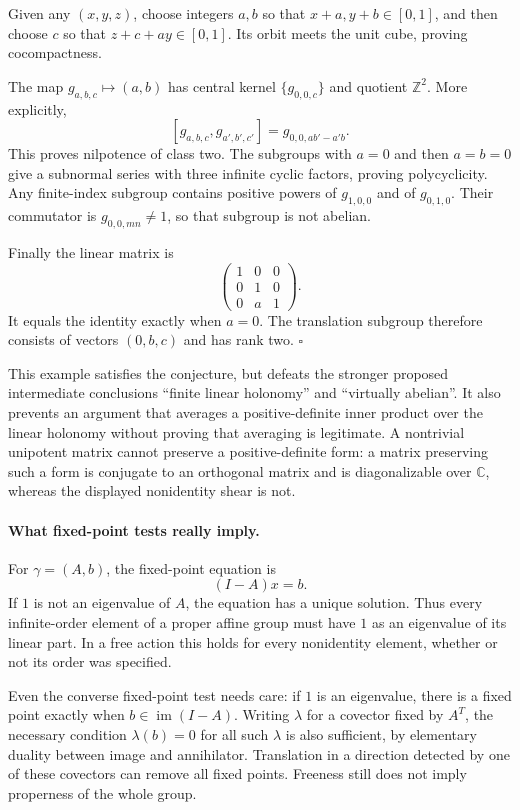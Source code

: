\documentclass[11pt]{article}
\begin{document}
Given any $(x,y,z)$, choose integers $a,b$ so that $x+a,y+b\in[0,1]$,
and then choose $c$ so that $z+c+ay\in[0,1]$. Its orbit meets the
unit cube, proving cocompactness.

The map $g_{a,b,c}\mapsto(a,b)$ has central kernel
$\{g_{0,0,c}\}$ and quotient $\mathbb Z^2$. More explicitly,
\[
 [g_{a,b,c},g_{a',b',c'}]=g_{0,0,ab'-a'b}.
\]
This proves nilpotence of class two. The subgroups with $a=0$ and then
$a=b=0$ give a subnormal series with three infinite cyclic factors,
proving polycyclicity. Any finite-index subgroup contains positive
powers of $g_{1,0,0}$ and of $g_{0,1,0}$. Their commutator is
$g_{0,0,mn}\ne1$, so that subgroup is not abelian.

Finally the linear matrix is
\[
 \begin{pmatrix}1&0&0\\0&1&0\\0&a&1\end{pmatrix}.
\]
It equals the identity exactly when $a=0$. The translation subgroup
therefore consists of vectors $(0,b,c)$ and has rank two.
\hfill$\square$

This example satisfies the conjecture, but defeats the stronger proposed
intermediate conclusions ``finite linear holonomy'' and ``virtually
abelian''. It also prevents an argument that averages a positive-definite
inner product over the linear holonomy without proving that averaging
is legitimate. A nontrivial unipotent matrix cannot preserve a
positive-definite form: a matrix preserving such a form is conjugate
to an orthogonal matrix and is diagonalizable over $\mathbb C$,
whereas the displayed nonidentity shear is not.

\paragraph{What fixed-point tests really imply.}
For $\gamma=(A,b)$, the fixed-point equation is
\[
 (I-A)x=b.
\]
If $1$ is not an eigenvalue of $A$, the equation has a unique solution.
Thus every infinite-order element of a proper affine group must have
$1$ as an eigenvalue of its linear part. In a free action this holds
for every nonidentity element, whether or not its order was specified.

Even the converse fixed-point test needs care: if $1$ is an eigenvalue,
there is a fixed point exactly when $b\in\operatorname{im}(I-A)$.
Writing $\lambda$ for a covector fixed by $A^T$, the necessary
condition $\lambda(b)=0$ for all such $\lambda$ is also sufficient,
by elementary duality between image and annihilator. Translation in a
direction detected by one of these covectors can remove all fixed points.
Freeness still does not imply properness of the whole group.
\end{document}
